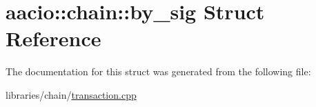 \hypertarget{structaacio_1_1chain_1_1by__sig}{}\section{aacio\+:\+:chain\+:\+:by\+\_\+sig Struct Reference}
\label{structaacio_1_1chain_1_1by__sig}


The documentation for this struct was generated from the following file\+:\begin{DoxyCompactItemize}
\item 
libraries/chain/\mbox{\hyperlink{transaction_8cpp}{transaction.\+cpp}}\end{DoxyCompactItemize}
